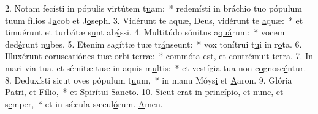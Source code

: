 2. Notam fecísti in pópulis virtútem t\uline{u}am:~* redemísti in bráchio tuo pópulum tuum fílios J\uline{a}cob et J\uline{o}seph.
3. Vidérunt te aquæ, Deus, vidérunt te \uline{a}quæ:~* et timuérunt et turbátæ s\uline{u}nt ab\uline{ý}ssi.
4. Multitúdo sónitus a\uline{quá}rum:~* vocem ded\uline{é}runt n\uline{u}bes.
5. Etenim sagíttæ tuæ tr\uline{á}nseunt:~* vox tonítrui t\uline{u}i in r\uline{o}ta.
6. Illuxérunt coruscatiónes tuæ orbi t\uline{e}rræ:~* commóta est, et contr\uline{é}muit t\uline{e}rra.
7. In mari via tua, et sémitæ tuæ in aquis m\uline{u}ltis:~* et vestígia tua non c\uline{o}gnosc\uline{é}ntur.
8. Deduxísti sicut oves pópulum t\uline{u}um,~* in manu Móys\uline{i} et \uline{A}aron.
9. Glória Patri, et F\uline{í}lio,~* et Spir\uline{í}tui S\uline{a}ncto.
10. Sicut erat in princípio, et nunc, et s\uline{e}mper,~* et in sǽcula sæcul\uline{ó}rum. \uline{A}men.
